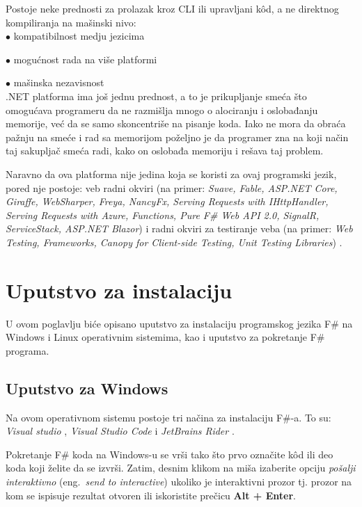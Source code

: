 \documentclass[a4paper]{article}
\begin{document}
Postoje neke prednosti za prolazak kroz CLI ili upravljani kôd, a ne direktnog kompiliranja na mašinski nivo:	\\

	$\bullet$ kompatibilnost medju jezicima
	
	$\bullet$ mogućnost rada na više platformi
	
	$\bullet$ mašinska nezavisnost
\\

.NET platforma ima još jednu prednost, a to je prikupljanje smeća što omogućava programeru da ne razmišlja mnogo o alociranju i oslobađanju memorije, već da se samo skoncentriše na pisanje koda. Iako ne mora da obraća pažnju na smeće i rad sa memorijom poželjno je da programer zna na koji način taj sakupljač smeća radi, kako on oslobađa memoriju i rešava taj problem.

Naravno da ova platforma nije jedina koja se koristi za ovaj programski jezik, pored nje postoje: veb radni okviri (na primer: {\em Suave, Fable, ASP.NET Core, Giraffe, WebSharper, Freya, NancyFx, Serving Requests with IHttpHandler, Serving Requests with Azure, Functions, Pure F\# Web API 2.0, SignalR, ServiceStack, ASP.NET Blazor}) i radni okviri za testiranje veba (na primer: {\em Web Testing, Frameworks, Canopy for Client-side Testing, Unit Testing Libraries}) \cite{fwFs}.

\section{Uputstvo za instalaciju}

U ovom poglavlju biće opisano uputstvo za instalaciju programskog jezika F\# na Windows i Linux operativnim sistemima, kao i uputstvo za pokretanje F\# programa.

\subsection{Uputstvo za Windows}

Na ovom operativnom sistemu postoje tri načina za instalaciju F\#-a. To su: {\em Visual studio} \cite{vStud}, {\em Visual Studio Code} \cite{vStudCode} i {\em JetBrains Rider} \cite{jetBrains}.

Pokretanje F\# koda na Windows-u se vrši tako što prvo označite kôd ili deo koda koji želite da se izvrši. Zatim, desnim klikom na miša izaberite opciju {\em pošalji interaktivno} (eng.~{\em send to interactive}) ukoliko je interaktivni prozor tj. prozor na kom se ispisuje rezultat otvoren ili iskoristite prečicu \textbf{Alt + Enter}.
\end{document}
